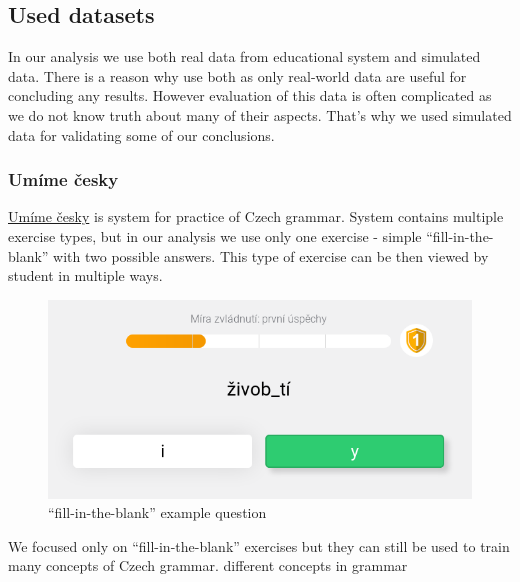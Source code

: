\documentclass[
  digital, %
  table,   %
  nolof,     %
  nolot,     %
  nocover
]{fithesis3}
\begin{document}
\subsection{Used datasets}\label{used-datasets}



In our analysis we use both real data from educational system and
simulated data. There is a reason why use both as only real-world data
are useful for concluding any results. However evaluation of this data
is often complicated as we do not know truth about many of their
aspects. That's why we used simulated data for validating some of our
conclusions.

\subsubsection{Umíme česky}\label{umime-cesky}


\href{https://umimecesky.cz/}{Umíme česky} is system for practice of
Czech grammar. System contains multiple exercise types, but in our
analysis we use only one exercise - simple ``fill-in-the-blank'' with
two possible answers. This type of exercise can be then viewed by
student in multiple ways. %

\begin{figure}
\centering
\includegraphics{img/umimecesky_doplnovacka}
\caption{``fill-in-the-blank'' example question}
\end{figure}

We focused only on ``fill-in-the-blank'' exercises but they can still be
used to train many concepts of Czech grammar. different concepts
in grammar

\end{document}
